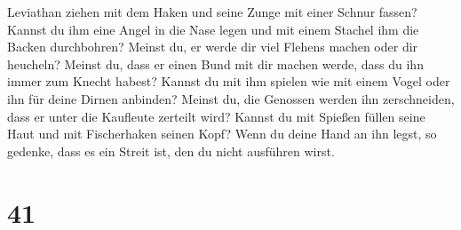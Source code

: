 Leviathan ziehen mit dem Haken und seine Zunge mit einer Schnur fassen?
 Kannst du ihm eine Angel in die Nase legen und mit einem
Stachel ihm die Backen durchbohren?  Meinst du, er werde
dir viel Flehens machen oder dir heucheln?  Meinst du,
dass er einen Bund mit dir machen werde, dass du ihn immer zum Knecht
habest?  Kannst du mit ihm spielen wie mit einem Vogel
oder ihn für deine Dirnen anbinden?  Meinst du, die
Genossen werden ihn zerschneiden, dass er unter die Kaufleute zerteilt
wird?  Kannst du mit Spießen füllen seine Haut und mit
Fischerhaken seinen Kopf?  Wenn du deine Hand an ihn
legst, so gedenke, dass es ein Streit ist, den du nicht ausführen wirst.

\hypertarget{section-40}{%
\section{41}\label{section-40}}

